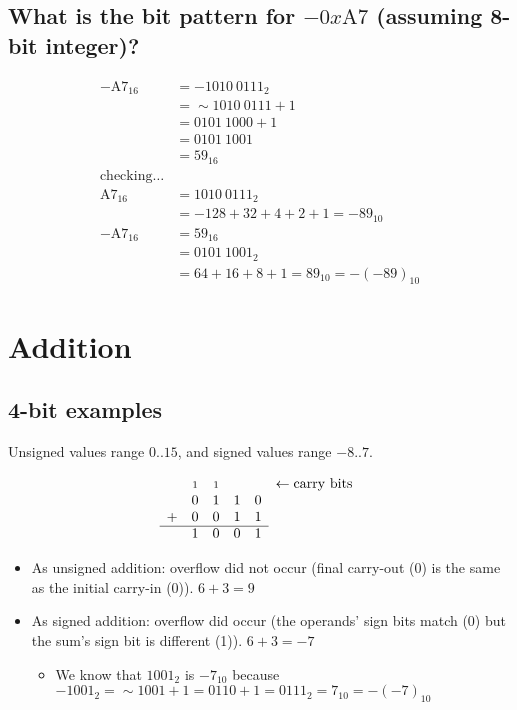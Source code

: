\documentclass{article}
\newcommand{\carry}{\scriptstyle 1}
\begin{document}
\vspace{1cm}

\subsection{What is the bit pattern for $-0x\mathrm{A7}$ (assuming 8-bit integer)?}

\begin{align*}
-\mathrm{A7}_{16} &= -1010\ 0111_2 \\
                  &= \sim 1010\ 0111 + 1 \\
                  &= 0101\ 1000 + 1 \\
                  &= 0101\ 1001 \\
                  &= 59_{16} \\
\mathrm{checking\dots} & \\
\mathrm{A7}_{16}  &= 1010\ 0111_2 \\
                  &= -128 + 32 + 4 + 2 + 1 = -89_{10} \\
-\mathrm{A7}_{16} &= 59_{16} \\
                  &= 0101\ 1001_2 \\
                  &= 64 + 16 + 8 + 1 = 89_{10} = -(-89)_{10}
\end{align*}


\section{Addition}

\subsection{4-bit examples}

Unsigned values range $0..15$, and signed values range $-8..7$.

\begin{equation*}\begin{array}{cccccl}
  & \carry & \carry & & & \leftarrow\mathrm{carry\ bits}\\
  & 0 & 1 & 1 & 0 & \\
+ & 0 & 0 & 1 & 1 & \\ \cline{1-5}
  & 1 & 0 & 0 & 1 &
\end{array}\end{equation*}

\begin{itemize}
\item As unsigned addition: overflow did not occur (final carry-out (0) is the
    same as the initial carry-in (0)). $6+3=9$
\item As signed addition: overflow did occur (the operands' sign bits match (0)
    but the sum's sign bit is different (1)). $6+3=-7$
    \begin{itemize}
    \item We know that $1001_2$ is $-7_{10}$ because \\
        $-1001_2 = \sim 1001 + 1 = 0110 + 1 = 0111_2 = 7_{10} = -(-7)_{10}$
    \end{itemize}
\end{itemize}
\end{document}
